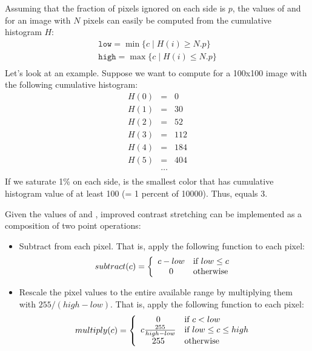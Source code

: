 \documentclass{book}
\begin{document}
Assuming that the fraction of pixels ignored on each side is $p$, the values of  and  for an image with $N$ pixels can easily be computed from the cumulative histogram $H$:
$$\begin{array}{c}
\mathtt{low} = \min \{ c \mid H(i) \geq N.p \} \\
\mathtt{high} = \max \{ c \mid H(i) \leq N.p \} \\
\end{array}$$
Let's look at an example. Suppose we want to compute  for a 100x100 image with the following cumulative histogram:
$$\begin{array}{rcl}
H(0) & = & 0\\
H(1) & = & 30\\
H(2) & = & 52\\
H(3) & = & 112\\
H(4) & = & 184\\
H(5) & = & 404\\
& \dots &\\
\end{array}$$
If we saturate 1\% on each side,  is the smallest color that has cumulative histogram value of at least 100 (= 1 percent of 10000). Thus,  equals $3$.

Given the values of  and , improved contrast stretching can be implemented as a composition of two point operations:
\begin{itemize}
  \item Subtract  from each pixel. That is, apply the following function to each pixel:
$$subtract(c) = \left\{\begin{array}{c l}
  c - {low} & \text{if ${low} \leq {c}$}\\
  0 & \text{otherwise}\\
\end{array}
\right.$$
  \item Rescale the pixel values to the entire available range by multiplying them with $255 / ({high} - {low})$. That is, apply the following function to each pixel:
$$multiply(c) = \left\{\begin{array}{c l}
  0 & \text{if $c < {low}$}\\
  c \frac{255}{{high} - {low}} & \text{if ${low} \leq c \leq {high}$}\\
  255 & \text{otherwise}\\
\end{array}
\right.$$
\end{itemize}
\end{document}
